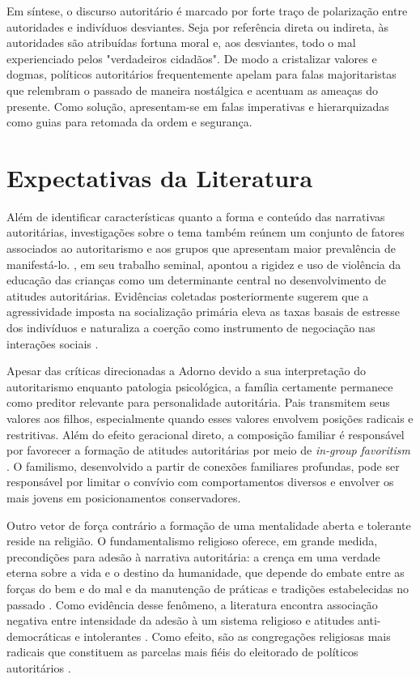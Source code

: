 \documentclass[
12pt,				%
openright,			%
twoside,			%
a4paper,			%
english,			%
french,				%
spanish,			%
brazil				%
]{abntex2}
\begin{document}
Em síntese, o discurso autoritário é marcado por forte traço de polarização entre autoridades e indivíduos desviantes. Seja por referência direta ou indireta, às autoridades são atribuídas fortuna moral e, aos desviantes, todo o mal experienciado pelos "verdadeiros cidadãos". De modo a cristalizar valores e dogmas, políticos autoritários frequentemente apelam para falas majoritaristas que relembram o passado de maneira nostálgica e acentuam as ameaças do presente. Como solução, apresentam-se em falas imperativas e hierarquizadas como guias para retomada da ordem e segurança. 

\section{Expectativas da Literatura}

Além de identificar características quanto a forma e conteúdo das narrativas autoritárias, investigações sobre o tema também reúnem um conjunto de fatores associados ao autoritarismo e aos grupos que apresentam maior prevalência de manifestá-lo. , em seu trabalho seminal, apontou a rigidez e uso de violência da educação das crianças como um determinante central no desenvolvimento de atitudes autoritárias. Evidências coletadas posteriormente sugerem que a agressividade imposta na socialização primária eleva as taxas basais de estresse dos indivíduos e naturaliza a coerção como instrumento de negociação nas interações sociais \cite{hopf1993authoritarians, van2009authoritarianism}.

Apesar das críticas direcionadas a Adorno devido a sua interpretação do autoritarismo enquanto patologia psicológica, a família certamente permanece como preditor relevante para personalidade autoritária. Pais transmitem seus valores aos filhos, especialmente quando esses valores envolvem posições radicais e restritivas. Além do efeito geracional direto, a composição familiar é responsável por favorecer a formação de atitudes autoritárias por meio de \emph{in-group favoritism} \cite{lewis2014common, altemeyer2006authoritarians}. O familismo, desenvolvido a partir de conexões familiares profundas, pode ser responsável por limitar o convívio com comportamentos diversos e envolver os mais jovens em posicionamentos conservadores.

Outro vetor de força contrário a formação de uma mentalidade aberta e tolerante reside na religião. O fundamentalismo religioso oferece, em grande medida, precondições para adesão à narrativa autoritária: a crença em uma verdade eterna sobre a vida e o destino da humanidade, que depende do embate entre as forças do bem e do mal e da manutenção de práticas e tradições estabelecidas no passado \cite{rokeach1956political,rokeach1960open}. Como evidência desse fenômeno, a literatura encontra associação negativa entre intensidade da adesão à um sistema religioso e atitudes anti-democráticas e intolerantes \cite{pereira2001sistemas,pereira2004sistemas,fuks2012atitudes}. Como efeito, são as congregações religiosas mais radicais que constituem as parcelas mais fiéis do eleitorado de políticos autoritários \cite{mudde2013exclusionary, betz2016against}.
\end{document}
